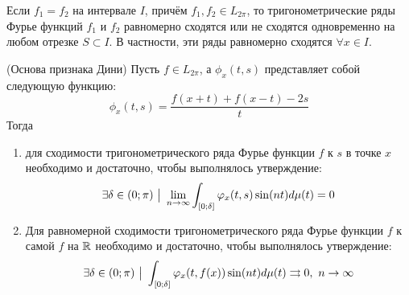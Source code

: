 \begin{corollary}
	Если $f_1 = f_2$ на интервале $I$, причём $f_1, f_2 \in L_{2\pi}$, то тригонометрические ряды Фурье функций $f_1$ и $f_2$ равномерно сходятся или не сходятся одновременно на любом отрезке $S \subset I$. В частности, эти ряды равномерно сходятся $\forall x \in I$.
\end{corollary}

\begin{lemma} (Основа признака Дини)
	Пусть $f \in L_{2\pi}$, а $\phi_x(t, s)$ представляет собой следующую функцию:
	\[
		\phi_x(t, s) = \frac{f(x + t) + f(x - t) - 2s}{t}
	\]
	Тогда
	\begin{enumerate}
	\item
	для сходимости тригонометрического ряда Фурье функции $f$ к $s$ в точке $x$ необходимо и достаточно, чтобы выполнялось утверждение:
	\[
		\exists \delta \in (0; \pi) \ \big|\  \lim_{n \to \infty} \int_{[0; \delta]} \varphi_x(t, s)\sin(nt)d\mu(t) = 0
	\]
	\item
	Для равномерной сходимости тригонометрического ряда Фурье функции $f$ к самой $f$ на $\mathbb{R}$ необходимо и достаточно, чтобы выполнялось утверждение:
	\[
		\exists \delta \in (0; \pi) \ \big|\  \int_{[0; \delta]} \varphi_x(t, f(x))\sin(nt)d\mu(t) \rightrightarrows 0, \ n \to \infty
	\]
	\end{enumerate}
\end{lemma}

